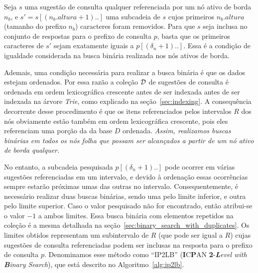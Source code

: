 Seja $s$ uma sugestão de consulta qualquer referenciada por um nó ativo de borda $n_{b}$, e $s' = s[(n_{b}.altura+1)..]$ uma subcadeia de $s$ cujos primeiros $n_{b}.altura$ (tamanho do prefixo $n_{b}$) caracteres foram removidos. Para que $s$ seja inclusa no conjunto de respostas para o prefixo de consulta $p$, basta que os primeiros caracteres de $s'$ sejam exatamente iguais a $p[(\delta_{n} + 1)..]$. Essa é a condição de igualdade considerada na busca binária realizada nos nós ativos de borda.

Ademais, uma condição necessária para realizar a busca binária é que os dados estejam ordenados. Por essa razão a coleção $\mathcal{D}$ de sugestões de consulta é ordenada em ordem lexicográfica crescente antes de ser indexada antes de ser indexada na árvore \textit{Trie}, como explicado na seção~\ref{sec:indexing}. A consequência decorrente desse procedimento é que os itens referenciados pelos intervalos $R$ dos nós obviamente estão também em ordem lexicográfica crescente, pois eles referenciam uma porção da da base $D$ ordenada. \textit{Assim, realizamos buscas binárias em todos os nós folha que possam ser alcançados a partir de um nó ativo de borda qualquer.} 

No entanto, a subcadeia pesquisada $p[(\delta_{n} + 1)..]$ pode ocorrer em várias sugestões referenciadas em um intervalo, e devido à ordenação essas ocorrências sempre estarão próximas umas das outras no intervalo. Consequentemente, é necessário realizar duas buscas binárias, sendo uma pelo limite inferior, e outra pelo limite superior. Caso o valor pesquisado não for encontrado, então atribui-se o valor $-1$ a ambos limites. Essa busca binária com elementos repetidos na coleção é a mesma detalhada na seção~\ref{sec:binary_search_with_duplicates}. Os limites obtidos representam um subintervalo de $R$ (que pode ser igual a $R$) cujas sugestões de consulta referenciadas podem ser inclusas na resposta para o prefixo de consulta $p$. Denominamos esse método como ``IP2LB'' (\textbf{I}C\textbf{P}AN \textbf{2}-\textit{\textbf{L}evel with \textbf{B}inary Search}), que está descrito no Algoritmo~\ref{alg:ip2lb}.

